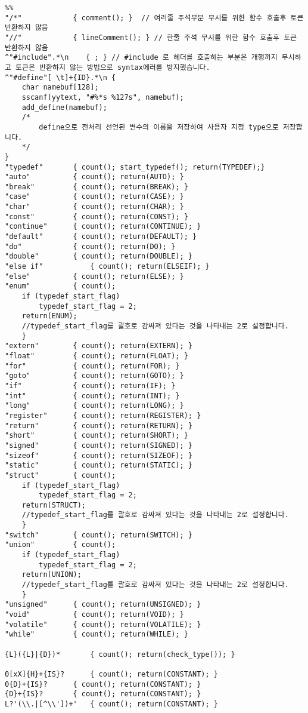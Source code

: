 \documentclass[11pt,oneside,a4paper]{article}
\begin{document}
\begin{verbatim}
%%
"/*"			{ comment(); }  // 여러줄 주석부분 무시를 위한 함수 호출후 토큰 반환하지 않음
"//"			{ lineComment(); } // 한줄 주석 무시를 위한 함수 호출후 토큰 반환하지 않음
^"#include".*\n    { ; } // #include 로 헤더를 호출하는 부분은 개행까지 무시하고 토큰은 반환하지 않는 방법으로 syntax에러를 방지했습니다.
^"#define"[ \t]+{ID}.*\n {
	char namebuf[128];
    sscanf(yytext, "#%*s %127s", namebuf);
    add_define(namebuf);
	/*
		define으로 전처리 선언된 변수의 이름을 저장하여 사용자 지정 type으로 저장합니다.
	*/
}
"typedef"		{ count(); start_typedef(); return(TYPEDEF);}
"auto"			{ count(); return(AUTO); }
"break"			{ count(); return(BREAK); }
"case"			{ count(); return(CASE); }
"char"			{ count(); return(CHAR); }
"const"			{ count(); return(CONST); }
"continue"		{ count(); return(CONTINUE); }
"default"		{ count(); return(DEFAULT); }
"do"			{ count(); return(DO); }
"double"		{ count(); return(DOUBLE); }
"else if"			{ count(); return(ELSEIF); }
"else"			{ count(); return(ELSE); }
"enum"			{ count(); 
	if (typedef_start_flag)
		typedef_start_flag = 2;
	return(ENUM); 
	//typedef_start_flag를 괄호로 감싸져 있다는 것을 나타내는 2로 설정합니다.
	}
"extern"		{ count(); return(EXTERN); }
"float"			{ count(); return(FLOAT); }
"for"			{ count(); return(FOR); }
"goto"			{ count(); return(GOTO); }
"if"			{ count(); return(IF); }
"int"			{ count(); return(INT); }
"long"			{ count(); return(LONG); }
"register"		{ count(); return(REGISTER); }
"return"		{ count(); return(RETURN); }
"short"			{ count(); return(SHORT); }
"signed"		{ count(); return(SIGNED); }
"sizeof"		{ count(); return(SIZEOF); }
"static"		{ count(); return(STATIC); }
"struct"		{ count(); 
	if (typedef_start_flag)
		typedef_start_flag = 2;
	return(STRUCT); 
	//typedef_start_flag를 괄호로 감싸져 있다는 것을 나타내는 2로 설정합니다.
	}
"switch"		{ count(); return(SWITCH); }
"union"			{ count(); 
	if (typedef_start_flag)
		typedef_start_flag = 2;
	return(UNION); 
	//typedef_start_flag를 괄호로 감싸져 있다는 것을 나타내는 2로 설정합니다.
	}
"unsigned"		{ count(); return(UNSIGNED); }
"void"			{ count(); return(VOID); }
"volatile"		{ count(); return(VOLATILE); }
"while"			{ count(); return(WHILE); }

{L}({L}|{D})*		{ count(); return(check_type()); }

0[xX]{H}+{IS}?		{ count(); return(CONSTANT); }
0{D}+{IS}?		{ count(); return(CONSTANT); }
{D}+{IS}?		{ count(); return(CONSTANT); }
L?'(\\.|[^\\'])+'	{ count(); return(CONSTANT); }


\end{verbatim}
\end{document}
